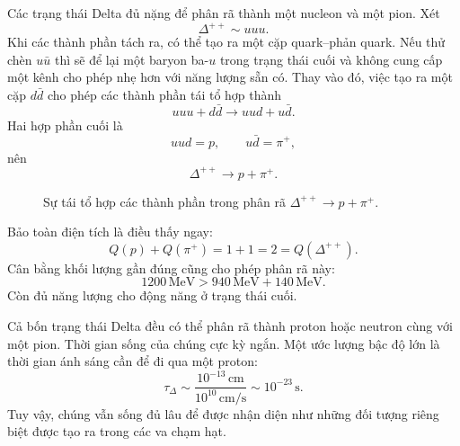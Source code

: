 Các trạng thái Delta đủ nặng để phân rã thành một nucleon và một pion. Xét
\begin{equation}
\Delta^{++}\sim uuu.
\end{equation}
Khi các thành phần tách ra, có thể tạo ra một cặp quark--phản quark. Nếu thử chèn \(u\bar u\) thì sẽ để lại một baryon ba-\(u\) trong trạng thái cuối và không cung cấp một kênh cho phép nhẹ hơn với năng lượng sẵn có. Thay vào đó, việc tạo ra một cặp \(d\bar d\) cho phép các thành phần tái tổ hợp thành
\begin{equation}
uuu+d\bar d
\longrightarrow
uud+u\bar d.
\end{equation}
Hai hợp phần cuối là
\begin{equation}
uud=p,
\qquad
u\bar d=\pi^+,
\end{equation}
nên
\begin{equation}
\Delta^{++}\longrightarrow p+\pi^+.
\end{equation}

\begin{figure}[h]
\centering
{}
\caption{Sự tái tổ hợp các thành phần trong phân rã \(\Delta^{++}\rightarrow p+\pi^+\).}
\end{figure}

Bảo toàn điện tích là điều thấy ngay:
\begin{equation}
Q(p)+Q(\pi^+)=1+1=2=Q(\Delta^{++}).
\end{equation}
Cân bằng khối lượng gần đúng cũng cho phép phân rã này:
\begin{equation}
1200\,\mathrm{MeV}
>
940\,\mathrm{MeV}+140\,\mathrm{MeV}.
\end{equation}
Còn đủ năng lượng cho động năng ở trạng thái cuối.

Cả bốn trạng thái Delta đều có thể phân rã thành proton hoặc neutron cùng với một pion. Thời gian sống của chúng cực kỳ ngắn. Một ước lượng bậc độ lớn là thời gian ánh sáng cần để đi qua một proton:
\begin{equation}
\tau_\Delta
\sim
\frac{10^{-13}\,\mathrm{cm}}
     {10^{10}\,\mathrm{cm/s}}
\sim10^{-23}\,\mathrm{s}.
\end{equation}
Tuy vậy, chúng vẫn sống đủ lâu để được nhận diện như những đối tượng riêng biệt được tạo ra trong các va chạm hạt.

